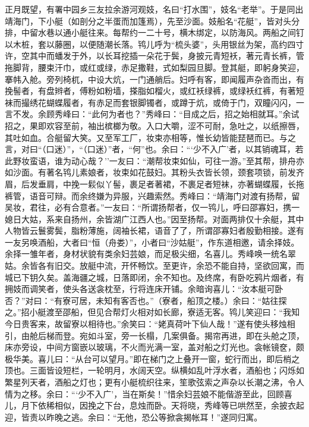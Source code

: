 \documentclass[]{article}
\begin{document}
正月既望，有署中园乡三友拉余游河观妓，名曰``打水围''，妓名``老举''。于是同出靖海门，下小艇（如剖分之半蛋而加篷焉），先至沙面。妓船名``花艇''，皆对头分排，中留水巷以通小艇往来。每帮约一二十号，横木绑定，以防海风。两船之间钉以木桩，套以藤圈，以便随潮长落。鸨儿呼为``梳头婆''，头用银丝为架，高约四寸许，空其中而蟠发于外，以长耳挖插一朵花于鬓，身披元青短袄，著元青长裤，管拖脚背，腰束汗巾，或红或绿，赤足撒鞋，式如梨园旦脚。登其艇，即躬身笑迎，搴帏入舱。旁列椅杌，中设大炕，一门通艄后。妇呼有客，即闻履声杂沓而出，有挽髻者，有盘辫者，傅粉如粉墙，搽脂如榴火，或红袄绿裤，或绿袄红裤，有著短袜而撮绣花蝴蝶履者，有赤足而套银脚镯者，或蹲于炕，或倚于门，双瞳闪闪，一言不发。余顾秀峰曰：``此何为者也？''秀峰曰：``目成之后，招之始相就耳。''余试招之，果即欢容至前，袖出槟榔为敬。入口大嚼，涩不可耐，急吐之，以纸擦唇，其吐如血。合艇留大笑。又至军工厂，妆束亦相等，惟长幼皆能琵琶而已。与之言，对曰``（口迷）''，``（口迷）''者，``何''也。余曰：```少不入广'者，以其销魂耳，若此野妆蛮语，谁为动心哉？''一友曰：``潮帮妆束如仙，可往一游。''至其帮，排舟亦如沙面。有著名鸨儿素娘者，妆束如花鼓妇。其粉头衣皆长领，颈套项锁，前发齐眉，后发垂肩，中挽一鬏似丫髻，裹足者著裙，不裹足者短袜，亦著蝴蝶履，长拖裤管，语音可辩。而余终嫌为异服，兴趣索然。秀峰曰：``靖海门对渡有扬帮，留吴妆，君往，必有合意者。''一友曰：``所谓扬帮者，仅一鸨儿，呼曰邵寡妇，携一媳日大姑，系来自扬州，余皆湖广江西人也。''因至扬帮。对面两排仅十余艇，其中人物皆云鬟雾鬓，脂粉薄施，阔袖长裙，语音了了，所谓邵寡妇者殷勤相接。遂有一友另唤酒船，大者曰``恒（舟娄）''，小者曰``沙姑艇''，作东道相邀，请余择妓。余择一雏年者，身材状貌有类余妇芸娘，而足极尖细，名喜儿。秀峰唤一统名翠姑。余皆各有旧交。放艇中流，开怀畅饮。至更许，余恐不能自持，坚欲回寓，而城已下钥久矣。盖海疆之城，日落即闭，余不知也。及终席，有卧吃鸦片烟者，有拥妓而调笑者，使头各送衾枕至，行将连床开铺。余暗询喜儿：``汝本艇可卧否？''对曰：``有寮可居，未知有客否也。''（寮者，船顶之楼。）余曰：``姑往探之。''招小艇渡至邵船，但见合帮灯火相对如长廊，寮适无客。鸨儿笑迎曰：``我知今日贵客来，故留寮以相待也。''余笑曰：``姥真荷叶下仙人哉！''遂有使头移烛相引，由舱后梯而登。宛如斗室，旁一长榻，几案俱备。揭帘再进，即在头舱之顶，床亦旁设，中间方窗嵌以玻璃，不火而光满一室，盖对船之灯光也。衾帐镜奁，颇极华美。喜儿曰：``从台可以望月。''即在梯门之上叠开一窗，蛇行而出，即后梢之顶也。三面皆设短栏，一轮明月，水阔天空。纵横如乱叶浮水者，酒船也；闪烁如繁星列天者，酒船之灯也；更有小艇梳织往来，笙歌弦索之声杂以长潮之沸，令人情为之移。余曰：```少不入广'，当在斯矣！''惜余妇芸娘不能偕游至此，回顾喜儿，月下依稀相似，因挽之下台，息烛而卧。天将晓，秀峰等已哄然至，余披衣起迎，皆责以昨晚之逃。余曰：``无他，恐公等掀衾揭帐耳！''遂同归寓。
\end{document}
